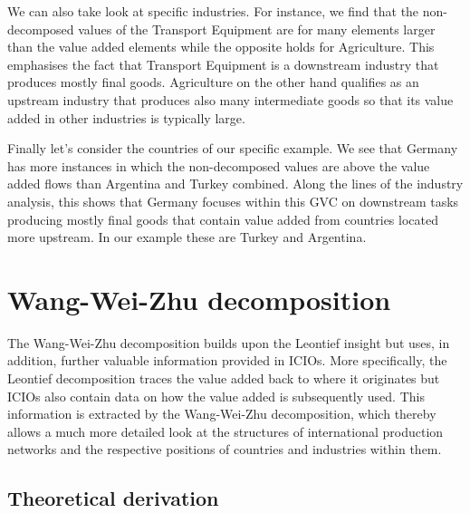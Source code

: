 \documentclass[a4paper]{article}\usepackage[]{graphicx}\usepackage[]{color}
\begin{document}
We can also take look at specific industries.
For instance, we find that the non-decomposed values of the Transport Equipment are for many elements larger than the value added elements while the opposite holds for Agriculture.
This emphasises the fact that Transport Equipment is a downstream industry that produces mostly final goods.
Agriculture on the other hand qualifies as an upstream industry that produces also many intermediate goods so that its value added in other industries is typically large.

Finally let's consider the countries of our specific example.
We see that Germany has more instances in which the non-decomposed values are above the value added flows than Argentina and Turkey combined.
Along the lines of the industry analysis, this shows that Germany focuses within this GVC on downstream tasks producing mostly final goods that contain value added from countries located more upstream.
In our example these are Turkey and Argentina.


\section{Wang-Wei-Zhu decomposition}
\label{sec:wwz}
The Wang-Wei-Zhu decomposition builds upon the Leontief insight but uses, in addition, further valuable information provided in ICIOs.
More specifically, the Leontief decomposition traces the value added back to where it originates but ICIOs also contain data on how the value added is subsequently used.
This information is extracted by the Wang-Wei-Zhu decomposition, 
which thereby allows a much more detailed look at the structures of international production networks and the respective positions of countries and industries within them.

\subsection{Theoretical derivation}
\end{document}
